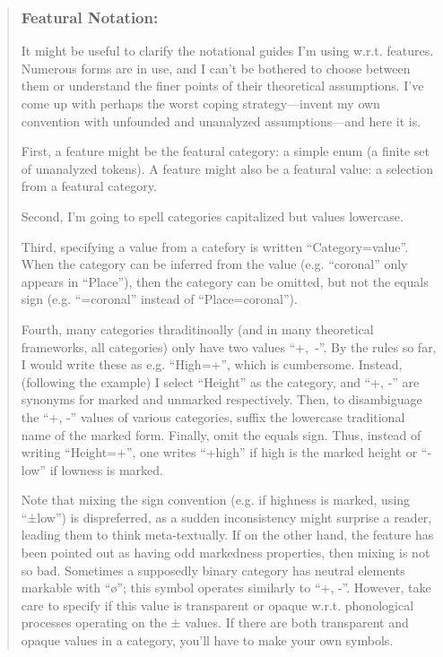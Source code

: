 \documentclass[12pt]{book} %
\begin{document}
\begin{quote}
\subsubsection{Featural Notation:}

It might be useful to clarify the notational guides I'm using w.r.t. features.
Numerous forms are in use, and I can't be bothered to choose between them or understand the finer points of their theoretical assumptions.
I've come up with perhaps the worst coping strategy---invent my own convention with unfounded and unanalyzed assumptions---and here it is.

First, a feature might be the featural category: a simple enum (a finite set of unanalyzed tokens).
A feature might also be a featural value: a selection from a featural category.

Second, I'm going to spell categories capitalized but values lowercase.

Third, specifying a value from a catefory is written ``Category=value''.
When the category can be inferred from the value (e.g. ``coronal'' only appears in ``Place''), then the category can be omitted, but not the equals sign (e.g. ``=coronal'' instead of ``Place=coronal'').

Fourth, many categories thraditinoally (and in many theoretical frameworks, all categories) only have two values ``+,~-''.
By the rules so far, I would write these as e.g. ``High=+'', which is cumbersome.
Instead, (following the example) I select ``Height'' as the category, and ``+, -'' are synonyms for marked and unmarked respectively.
Then, to disambiguage the ``+, -'' values of various categories, suffix the lowercase traditional name of the marked form.
Finally, omit the equals sign.
Thus, instead of writing ``Height=+'', one writes ``+high'' if high is the marked height or ``-low'' if lowness is marked.

Note that mixing the sign convention (e.g. if highness is marked, using ``±low'') is dispreferred, as a sudden inconsistency might surprise a reader, leading them to think meta-textually.
If on the other hand, the feature has been pointed out as having odd markedness properties, then mixing is not so bad.
Sometimes a supposedly binary category has neutral elements markable with ``ø''; this symbol operates similarly to ``+, -''.
However, take care to specify if this value is transparent or opaque w.r.t. phonological processes operating on the ± values.
If there are both transparent and opaque values in a category, you'll have to make your own symbols.
\end{quote}
\end{document}
